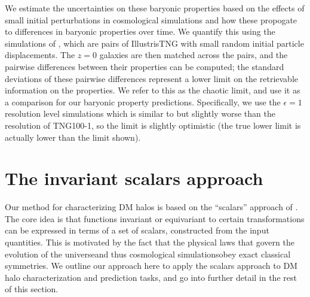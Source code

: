 We estimate the uncertainties on these baryonic properties based on the effects of small initial perturbations in cosmological simulations and how these propogate to differences in baryonic properties over time.
We quantify this using the simulations of \cite{Genel2019}, which are pairs of IllustrisTNG with small random initial particle displacements.
The $z=0$ galaxies are then matched across the pairs, and the pairwise differences between their properties can be computed; the standard deviations of these pairwise differences represent a lower limit on the retrievable information on the properties.
We refer to this as the chaotic limit, and use it as a comparison for our baryonic property predictions.
Specifically, we use the $\epsilon=1$ resolution level simulations which is similar to but slightly worse than the resolution of TNG100-1, so the limit is slightly optimistic (the true lower limit is actually lower than the limit shown).


\section{The invariant scalars approach}
\label{sec:scalars_approach}

Our method for characterizing DM halos is based on the ``scalars'' approach of \cite{Villar2021a}.
The core idea is that functions invariant or equivariant to certain transformations can be expressed in terms of a set of scalars, constructed from the input quantities.  
This is motivated by the fact that the physical laws that govern the evolution of the universe{\emdash}and thus cosmological simulations{\emdash}obey exact classical symmetries.
We outline our approach here to apply the scalars approach to DM halo characterization and prediction tasks, and go into further detail in the rest of this section.

